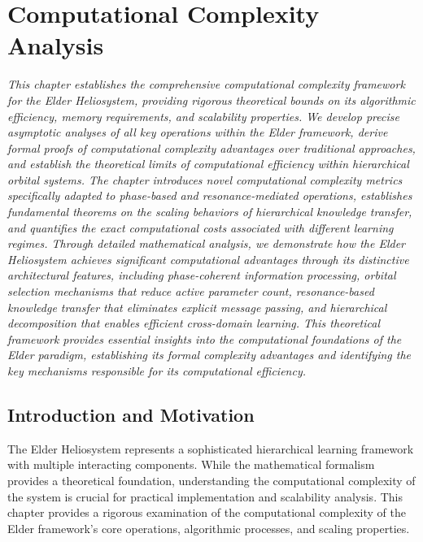 \chapter{Computational Complexity Analysis}

\textit{This chapter establishes the comprehensive computational complexity framework for the Elder Heliosystem, providing rigorous theoretical bounds on its algorithmic efficiency, memory requirements, and scalability properties. We develop precise asymptotic analyses of all key operations within the Elder framework, derive formal proofs of computational complexity advantages over traditional approaches, and establish the theoretical limits of computational efficiency within hierarchical orbital systems. The chapter introduces novel computational complexity metrics specifically adapted to phase-based and resonance-mediated operations, establishes fundamental theorems on the scaling behaviors of hierarchical knowledge transfer, and quantifies the exact computational costs associated with different learning regimes. Through detailed mathematical analysis, we demonstrate how the Elder Heliosystem achieves significant computational advantages through its distinctive architectural features, including phase-coherent information processing, orbital selection mechanisms that reduce active parameter count, resonance-based knowledge transfer that eliminates explicit message passing, and hierarchical decomposition that enables efficient cross-domain learning. This theoretical framework provides essential insights into the computational foundations of the Elder paradigm, establishing its formal complexity advantages and identifying the key mechanisms responsible for its computational efficiency.}

\section{Introduction and Motivation}

The Elder Heliosystem represents a sophisticated hierarchical learning framework with multiple interacting components. While the mathematical formalism provides a theoretical foundation, understanding the computational complexity of the system is crucial for practical implementation and scalability analysis. This chapter provides a rigorous examination of the computational complexity of the Elder framework's core operations, algorithmic processes, and scaling properties.

